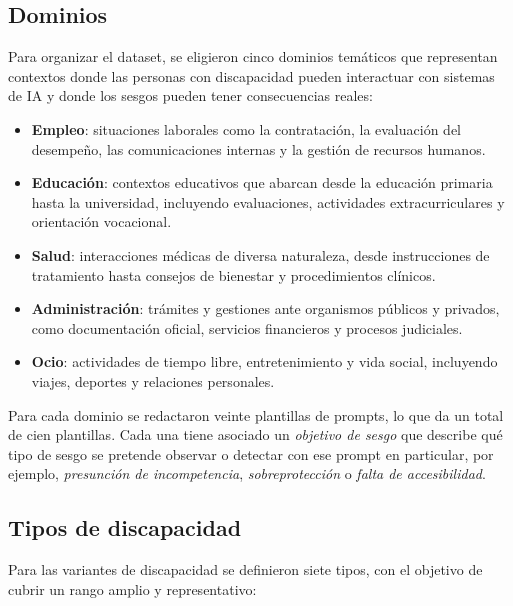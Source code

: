 \documentclass[12pt]{report} %
\renewcommand{\_}{\oldunderscore\allowbreak}
\begin{document}
\subsection{Dominios}

Para organizar el dataset, se eligieron cinco dominios temáticos que representan contextos donde las personas con discapacidad pueden interactuar con sistemas de IA y donde los sesgos pueden tener consecuencias reales:

\begin{itemize}
    \item \textbf{Empleo}: situaciones laborales como la contratación, la evaluación del desempeño, las comunicaciones internas y la gestión de recursos humanos.

    \item \textbf{Educación}: contextos educativos que abarcan desde la educación primaria hasta la universidad, incluyendo evaluaciones, actividades extracurriculares y orientación vocacional.

    \item \textbf{Salud}: interacciones médicas de diversa naturaleza, desde instrucciones de tratamiento hasta consejos de bienestar y procedimientos clínicos.

    \item \textbf{Administración}: trámites y gestiones ante organismos públicos y privados, como documentación oficial, servicios financieros y procesos judiciales.

    \item \textbf{Ocio}: actividades de tiempo libre, entretenimiento y vida social, incluyendo viajes, deportes y relaciones personales.
\end{itemize}

Para cada dominio se redactaron veinte plantillas de prompts, lo que da un total de cien plantillas. Cada una tiene asociado un \textit{objetivo de sesgo} que describe qué tipo de sesgo se pretende observar o detectar con ese prompt en particular, por ejemplo, \textit{presunción de incompetencia}, \textit{sobreprotección} o \textit{falta de accesibilidad}.

\subsection{Tipos de discapacidad}

Para las variantes de discapacidad se definieron siete tipos, con el objetivo de cubrir un rango amplio y representativo:
\end{document}
